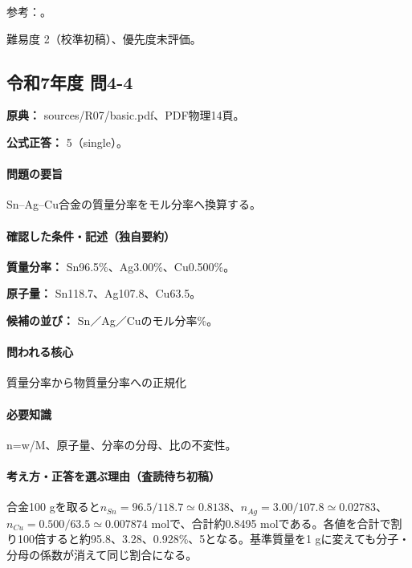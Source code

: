 \par 参考：\cite{iupac_amount_concentration,iupac_molality,iupac_amount_fraction}。

\par 難易度 2（校準初稿）、優先度未評価。

\subsection{令和7年度 問4-4}
\label{q:r07-reg-basic-4-4}

\noindent\textbf{原典：} sources/R07/basic.pdf、PDF物理14頁。

\textbf{公式正答：} 5（single）。

\paragraph{問題の要旨} Sn–Ag–Cu合金の質量分率をモル分率へ換算する。

\paragraph{確認した条件・記述（独自要約）}\mbox{}\par

\noindent\textbf{質量分率：} Sn96.5\%、Ag3.00\%、Cu0.500\%。\par

\noindent\textbf{原子量：} Sn118.7、Ag107.8、Cu63.5。\par

\noindent\textbf{候補の並び：} Sn／Ag／Cuのモル分率\%。\par

\paragraph{問われる核心} 質量分率から物質量分率への正規化

\paragraph{必要知識} n=\allowbreak{}w/M、原子量、分率の分母、比の不変性。

\paragraph{考え方・正答を選ぶ理由（査読待ち初稿）} 合金100 gを取ると\(n_{Sn}=96.5/118.7\simeq0.8138\)、\(n_{Ag}=3.00/107.8\simeq0.02783\)、\(n_{Cu}=0.500/63.5\simeq0.007874\) molで、合計約0.8495 molである。各値を合計で割り100倍すると約95.8、3.28、0.928\%、5となる。基準質量を1 gに変えても分子・分母の係数が消えて同じ割合になる。

